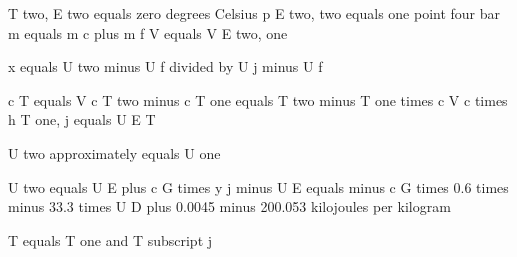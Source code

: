 T two, E two equals zero degrees Celsius  
p E two, two equals one point four bar  
m equals m c plus m f  
V equals V E two, one  

x equals U two minus U f divided by U j minus U f  

c T equals V  
c T two minus c T one equals T two minus T one times c V  
c times h T one, j equals U E T  

U two approximately equals U one  

U two equals U E plus c G times y j minus U E equals minus c G times 0.6 times minus 33.3 times U D plus 0.0045 minus 200.053 kilojoules per kilogram  

T equals T one and T subscript j